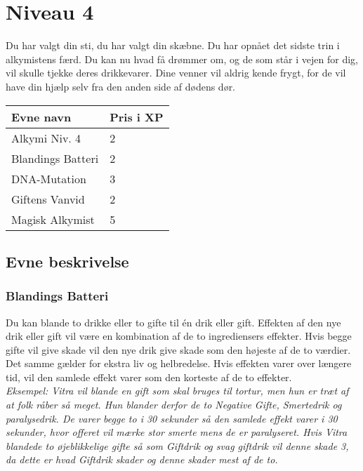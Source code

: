 \chapter{Niveau 4}
Du har valgt din sti, du har valgt din skæbne. Du har opnået det sidste trin i alkymistens færd. Du kan nu hvad få drømmer om, og de som står i vejen for dig, vil skulle tjekke deres drikkevarer. Dine venner vil aldrig kende frygt, for de vil have din hjælp selv fra den anden side af dødens dør.\\


\begin{table}[H]
    \centering
    \begin{tabular}{|p{}|p{}|}
    \rowcolor{cerulean!80}\hline
    Evne navn & Pris i XP\\\hline
    Alkymi Niv. 4 & 2 \\\hline
    Blandings Batteri & 2 \\ \hline
    DNA-Mutation & 3 \\\hline
    Giftens Vanvid & 2\\\hline
    Magisk Alkymist  & 5\\\hline
    \end{tabular}
\end{table}
\section{Evne beskrivelse}



\subsection{Blandings Batteri}
Du kan blande to drikke eller to gifte til én drik eller gift. Effekten af den nye drik eller gift vil være en kombination af de to ingrediensers effekter. Hvis begge gifte vil give skade vil den nye drik give skade som den højeste af de to værdier. Det samme gælder for ekstra liv og helbredelse. Hvis effekten varer over længere tid, vil den samlede effekt varer som den korteste af de to effekter.\\
\textit{Eksempel: Vitra vil blande en gift som skal bruges til tortur, men hun er træt af at folk råber så meget. Hun blander derfor de to Negative Gifte, Smertedrik og paralysedrik. De varer begge to i 30 sekunder så den samlede effekt varer i 30 sekunder, hvor offeret vil mærke stor smerte mens de er paralyseret. Hvis Vitra blandede to øjeblikkelige gifte så som Giftdrik og svag giftdrik vil denne skade 3, da dette er hvad Giftdrik skader og denne skader mest af de to.}

